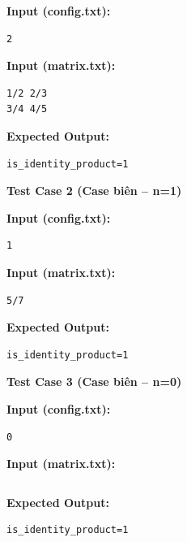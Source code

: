 \textbf{Input (config.txt):}
\begin{lstlisting}
2
\end{lstlisting}

\textbf{Input (matrix.txt):}
\begin{lstlisting}
1/2 2/3
3/4 4/5
\end{lstlisting}

\textbf{Expected Output:}
\begin{lstlisting}
is_identity_product=1
\end{lstlisting}

\vspace{0.5cm}

\textbf{Test Case 2 (Case biên -- n=1)}

\textbf{Input (config.txt):}
\begin{lstlisting}
1
\end{lstlisting}

\textbf{Input (matrix.txt):}
\begin{lstlisting}
5/7
\end{lstlisting}

\textbf{Expected Output:}
\begin{lstlisting}
is_identity_product=1
\end{lstlisting}

\vspace{0.5cm}

\textbf{Test Case 3 (Case biên -- n=0)}

\textbf{Input (config.txt):}
\begin{lstlisting}
0
\end{lstlisting}

\textbf{Input (matrix.txt):}
\begin{lstlisting}

\end{lstlisting}

\textbf{Expected Output:}
\begin{lstlisting}
is_identity_product=1
\end{lstlisting}